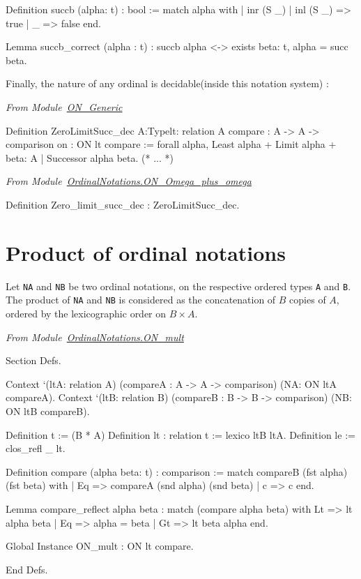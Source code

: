 \begin{Coqsrc}
Definition succb (alpha: t) : bool := match alpha with
                                 | inr (S  _) | inl (S _) => true
                                 | _ => false
                                 end.

Lemma succb_correct (alpha : t) :
    succb alpha <->  exists beta: t, alpha = succ beta.
\end{Coqsrc}


Finally, the nature of any ordinal is decidable(inside this notation system) :

\noindent\emph{From Module~\href{../theories/html/hydras.OrdinalNotations.ON_Generic.html}{ON\_Generic}}
\begin{Coqsrc}
  Definition ZeroLimitSucc_dec {A:Type}{lt: relation A}
           {compare : A -> A -> comparison}
           {on : ON lt compare} :=
  forall alpha,
    {Least alpha} +
    {Limit alpha} +
    {beta: A | Successor alpha beta}.
(* ... *)
\end{Coqsrc}

\noindent\emph{From Module~\href{../theories/html/hydras.OrdinalNotations.ON_Omega_plus_omega.html}{OrdinalNotations.ON\_Omega\_plus\_omega}}

\begin{Coqsrc}
Definition Zero_limit_succ_dec : ZeroLimitSucc_dec.
\end{Coqsrc}

\section{Product of ordinal notations}

Let \texttt{NA} and \texttt{NB} be two ordinal notations, on the respective  ordered types \texttt{A} and \texttt{B}. The product of \texttt{NA} and \texttt{NB} is considered as the concatenation of $B$ copies of $A$, ordered by the lexicographic order on $B\times A$.

\vspace{4pt}
\noindent
\emph{From Module~\href{../theories/html/hydras.OrdinalNotations.ON_mult.html}{OrdinalNotations.ON\_mult}}

\begin{Coqsrc}
Section Defs.

  Context `(ltA: relation A)
          (compareA : A -> A -> comparison)
          (NA: ON ltA compareA).
  Context `(ltB: relation B)
          (compareB : B -> B -> comparison)
          (NB: ON ltB compareB).

Definition t := (B * A)%
Definition lt : relation t := lexico ltB ltA.
Definition le := clos_refl _ lt.

Definition compare (alpha beta: t) : comparison :=
  match compareB (fst alpha) (fst beta) with
  |  Eq => compareA (snd alpha) (snd beta)
  | c => c
  end.

Lemma compare_reflect alpha beta :
  match (compare alpha beta)
  with
    Lt => lt alpha  beta
  | Eq => alpha = beta
  | Gt => lt beta  alpha
  end.

Global Instance ON_mult : ON lt compare.

End Defs.
\end{Coqsrc}

